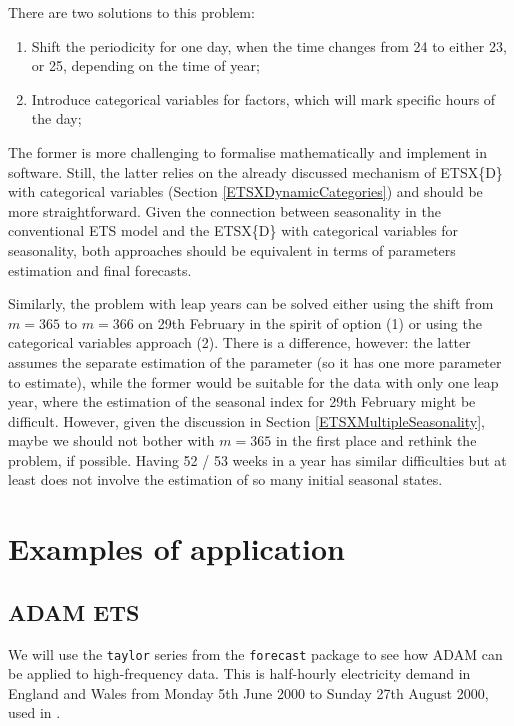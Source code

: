 \documentclass[
]{book}
\providecommand{\tightlist}{%
  \setlength{\itemsep}{0pt}\setlength{\parskip}{0pt}}
\theoremstyle{definition}
\theoremstyle{definition}
\theoremstyle{definition}
\theoremstyle{definition}
\theoremstyle{remark}
\begin{document}
There are two solutions to this problem:

\begin{enumerate}
\def\labelenumi{\arabic{enumi}.}
\tightlist
\item
  Shift the periodicity for one day, when the time changes from 24 to either 23, or 25, depending on the time of year;
\item
  Introduce categorical variables for factors, which will mark specific hours of the day;
\end{enumerate}

The former is more challenging to formalise mathematically and implement in software. Still, the latter relies on the already discussed mechanism of ETSX\{D\} with categorical variables (Section \ref{ETSXDynamicCategories}) and should be more straightforward. Given the connection between seasonality in the conventional ETS model and the ETSX\{D\} with categorical variables for seasonality, both approaches should be equivalent in terms of parameters estimation and final forecasts.

Similarly, the problem with leap years can be solved either using the shift from \(m=365\) to \(m=366\) on 29th February in the spirit of option (1) or using the categorical variables approach (2). There is a difference, however: the latter assumes the separate estimation of the parameter (so it has one more parameter to estimate), while the former would be suitable for the data with only one leap year, where the estimation of the seasonal index for 29th February might be difficult. However, given the discussion in Section \ref{ETSXMultipleSeasonality}, maybe we should not bother with \(m=365\) in the first place and rethink the problem, if possible. Having 52 / 53 weeks in a year has similar difficulties but at least does not involve the estimation of so many initial seasonal states.

\hypertarget{ADAMMultipleFrequenciesExamples}{%
\section{Examples of application}\label{ADAMMultipleFrequenciesExamples}}

\hypertarget{adam-ets}{%
\subsection{ADAM ETS}\label{adam-ets}}

We will use the \texttt{taylor} series from the \texttt{forecast} package to see how ADAM can be applied to high-frequency data. This is half-hourly electricity demand in England and Wales from Monday 5th June 2000 to Sunday 27th August 2000, used in \citet{Taylor2003a}.
\end{document}
